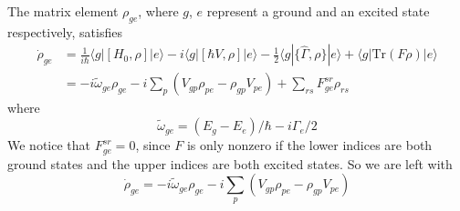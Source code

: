 \documentclass[11pt,letter]{article}
\begin{document}
The matrix element $\rho_{ge}$, where $g$, $e$ represent a ground and an
excited state respectively, satisfies
\begin{equation}
\begin{split}
  \dot{\rho}_{ge}  & =  
   \frac{1}{i\hbar} \langle g | [ H_{0}, \rho ] | e \rangle  
 - i \langle g | [ \hbar V, \rho ] | e \rangle 
 - \frac{1}{2}\langle g | \lbrace \hat{\Gamma}, \rho \rbrace | e \rangle 
 + \langle g | \text{Tr}( F \rho ) | e \rangle  \\
 & = -i \tilde{\omega}_{ge}  \rho_{ge}  
     -i \sum_{p}\left( V_{gp} \rho_{pe} - \rho_{gp}V_{pe} \right) 
     +  \sum_{rs} F_{ge}^{sr} \rho_{rs}
\end{split} 
\end{equation}
where 
\begin{equation}
  \tilde{\omega}_{ge} = (E_{g} - E_{e})/\hbar - i \Gamma_{e} /2 
\end{equation}
We notice that $F_{ge}^{sr} = 0$, since $F$ is only nonzero if the lower
indices are both ground states and the upper indices are both excited states.
So we are left with 
\begin{equation}
  \dot{\rho}_{ge}  =  
     -i \tilde{\omega}_{ge}  \rho_{ge}  
     -i \sum_{p}\left( V_{gp} \rho_{pe} - \rho_{gp}V_{pe} \right) 
\end{equation}
\end{document}
